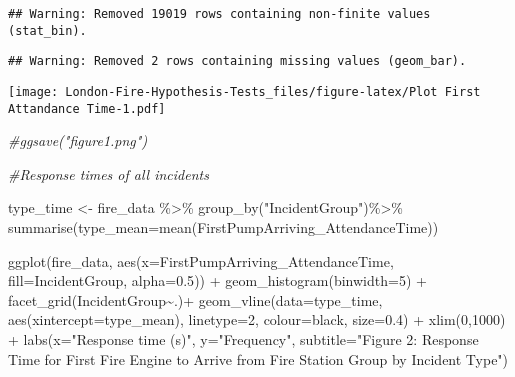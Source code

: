 \documentclass[
]{article}
\newenvironment{Shaded}{\begin{snugshade}}{\end{snugshade}}
\newcommand{\AttributeTok}[1]{\textcolor[rgb]{0.77,0.63,0.00}{#1}}
\newcommand{\CommentTok}[1]{\textcolor[rgb]{0.56,0.35,0.01}{\textit{#1}}}
\newcommand{\DecValTok}[1]{\textcolor[rgb]{0.00,0.00,0.81}{#1}}
\newcommand{\FloatTok}[1]{\textcolor[rgb]{0.00,0.00,0.81}{#1}}
\newcommand{\FunctionTok}[1]{\textcolor[rgb]{0.00,0.00,0.00}{#1}}
\newcommand{\NormalTok}[1]{#1}
\newcommand{\OtherTok}[1]{\textcolor[rgb]{0.56,0.35,0.01}{#1}}
\newcommand{\SpecialCharTok}[1]{\textcolor[rgb]{0.00,0.00,0.00}{#1}}
\newcommand{\StringTok}[1]{\textcolor[rgb]{0.31,0.60,0.02}{#1}}
\begin{document}
\begin{verbatim}
## Warning: Removed 19019 rows containing non-finite values (stat_bin).
\end{verbatim}

\begin{verbatim}
## Warning: Removed 2 rows containing missing values (geom_bar).
\end{verbatim}

\texttt{[image: London-Fire-Hypothesis-Tests\_files/figure-latex/Plot First Attandance Time-1.pdf]}

\begin{Shaded}
\begin{Highlighting}[]
\CommentTok{\#ggsave("figure1.png")}

\CommentTok{\#Response times of all incidents}
\end{Highlighting}
\end{Shaded}

\begin{Shaded}
\begin{Highlighting}[]
\NormalTok{type\_time }\OtherTok{\textless{}{-}}\NormalTok{ fire\_data }\SpecialCharTok{\%\textgreater{}\%} \FunctionTok{group\_by}\NormalTok{(}\StringTok{"IncidentGroup"}\NormalTok{)}\SpecialCharTok{\%\textgreater{}\%}  \FunctionTok{summarise}\NormalTok{(}\AttributeTok{type\_mean=}\FunctionTok{mean}\NormalTok{(FirstPumpArriving\_AttendanceTime))}

\FunctionTok{ggplot}\NormalTok{(fire\_data, }\FunctionTok{aes}\NormalTok{(}\AttributeTok{x=}\NormalTok{FirstPumpArriving\_AttendanceTime, }\AttributeTok{fill=}\NormalTok{IncidentGroup, }\AttributeTok{alpha=}\FloatTok{0.5}\NormalTok{)) }\SpecialCharTok{+} 
    \FunctionTok{geom\_histogram}\NormalTok{(}\AttributeTok{binwidth=}\DecValTok{5}\NormalTok{) }\SpecialCharTok{+} 
    \FunctionTok{facet\_grid}\NormalTok{(IncidentGroup}\SpecialCharTok{\textasciitilde{}}\NormalTok{.)}\SpecialCharTok{+} 
    \FunctionTok{geom\_vline}\NormalTok{(}\AttributeTok{data=}\NormalTok{type\_time, }\FunctionTok{aes}\NormalTok{(}\AttributeTok{xintercept=}\NormalTok{type\_mean), }\AttributeTok{linetype=}\DecValTok{2}\NormalTok{, }\AttributeTok{colour=}\StringTok{\textquotesingle{}black\textquotesingle{}}\NormalTok{, }\AttributeTok{size=}\FloatTok{0.4}\NormalTok{) }\SpecialCharTok{+} 
    \FunctionTok{xlim}\NormalTok{(}\DecValTok{0}\NormalTok{,}\DecValTok{1000}\NormalTok{) }\SpecialCharTok{+} 
    \FunctionTok{labs}\NormalTok{(}\AttributeTok{x=}\StringTok{"Response time (s)"}\NormalTok{, }
         \AttributeTok{y=}\StringTok{"Frequency"}\NormalTok{,}
         \AttributeTok{subtitle=}\StringTok{"Figure 2: Response Time for First Fire Engine to Arrive from Fire Station Group by Incident Type"}\NormalTok{)}
\end{Highlighting}
\end{Shaded}
\end{document}
